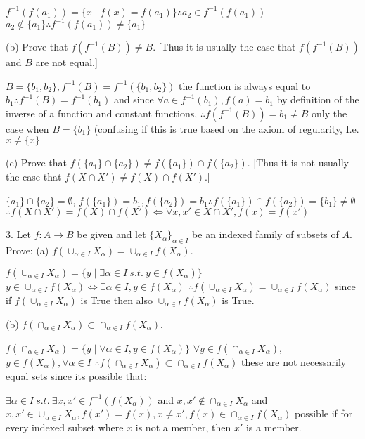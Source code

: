 $f^{-1}(f(a_{1})) = \{ x \mid f(x) = f(a_{1})\} \therefore a_{2} \in f^{-1}(f(a_{1}))$
$a_{2} \not \in \{ a_{1}\} \therefore f^{-1}(f(a_{1})) \not = \{a_{1}\}$

(b) Prove that $f(f^{-1}(B)) \not = B$. [Thus it is usually the case that $f(f^{-1}(B))$ and $B$ are not equal.]

$B = \{ b_{1}, b_{2}\}, f^{-1}(B) = f^{-1}(\{ b_{1}, b_{2}\}) $ the function is always equal  to $b_{1} \therefore f^{-1}(B) = f^{-1}(b_{1})$
and since $\forall a \in f^{-1}(b_{1}), f(a) = b_{1}$ by definition of the inverse of a function and constant functions,
$\therefore f(f^{-1}(B)) = b_{1} \not = B$ only the  case when $B = \{ b_{1}\}$ (confusing if this is true based on the axiom of regularity, I.e. $x \not = \{ x \}$

(c) Prove that $f(\{a_{1}\} \cap \{ a_{2}\} ) \not = f(\{a_{1}\}) \cap f(\{ a_{2}\})$. [Thus it is not usually the case that $f(X \cap X') \not = f(X) \cap f(X')$.]

$\{ a_{1}\} \cap \{a_{2}\} = \emptyset$, $f(\{ a_{1}\} ) = b_{1}, f(\{a_{2}\}) = b_{1} \therefore f(\{a_{1}\}) \cap f(\{ a_{2}\}) = \{b_{1}\} \not =  \emptyset$
$\therefore f(X \cap X') = f(X) \cap f(X') \iff \forall x, x' \in X \cap X', f(x) = f(x')$

3. Let $f: A \rightarrow B$ be given and let $\{ X_{\alpha}\}_{\alpha \in I}$ be an indexed family of subsets of $A$. Prove:
(a) $f(\cup_{\alpha \in I}X_{\alpha}) = \cup_{\alpha \in I} f(X_{\alpha})$.

$f(\cup_{\alpha \in I} X_{\alpha}) = \{ y \mid \exists \alpha \in I\ s.t.\ y \in f(X_{\alpha})\}$
$y \in \cup_{\alpha \in I} f(X_{\alpha}) \iff \exists \alpha \in I, y \in f(X_{\alpha})$
$\therefore f(\cup_{\alpha \in I}X_{\alpha}) = \cup_{\alpha \in I} f(X_{\alpha})$ since if $f(\cup_{\alpha \in I}X_{\alpha})$ is True then also $\cup_{\alpha \in I} f(X_{\alpha})$ is True.

(b) $f(\cap_{\alpha \in I} X_{\alpha}) \subset \cap_{\alpha \in I}f(X_{\alpha})$.

$f(\cap_{\alpha \in I} X_{\alpha}) = \{ y\mid \forall \alpha \in I, y \in f(X_{\alpha})\}$
$\forall y \in  f(\cap_{\alpha \in I} X_{\alpha})$, $y \in f(X_{\alpha}), \forall\alpha \in I$
$\therefore f(\cap_{\alpha \in I} X_{\alpha}) \subset \cap_{\alpha \in I}f(X_{\alpha})$ these are not necessarily equal sets since its possible that:

$\exists \alpha \in I\ s.t.\ \exists x, x' \in f^{-1}(f(X_{\alpha}))$ and $ x, x' \not \in \cap_{\alpha \in I} X_{\alpha}$ and $ x,x' \in \cup_{\alpha \in I} X_{\alpha}, f(x') = f(x), x \not = x', f(x) \in \cap_{\alpha \in I}f(X_{\alpha})$ possible if for every indexed subset where $x$ is not a member, then $x'$ is a member. 

